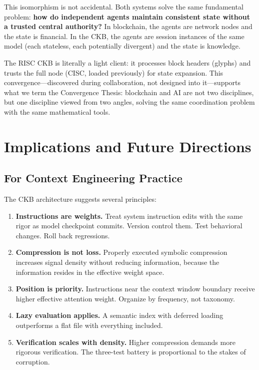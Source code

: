 \documentclass[11pt, a4paper]{article}
\begin{document}
This isomorphism is not accidental. Both systems solve the same fundamental problem: \textbf{how do independent agents maintain consistent state without a trusted central authority?} In blockchain, the agents are network nodes and the state is financial. In the CKB, the agents are session instances of the same model (each stateless, each potentially divergent) and the state is knowledge.

The RISC CKB is literally a light client: it processes block headers (glyphs) and trusts the full node (CISC, loaded previously) for state expansion. This convergence---discovered during collaboration, not designed into it---supports what we term the Convergence Thesis: blockchain and AI are not two disciplines, but one discipline viewed from two angles, solving the same coordination problem with the same mathematical tools.

\section{Implications and Future Directions}
\label{sec:implications}

\subsection{For Context Engineering Practice}

The CKB architecture suggests several principles:

\begin{enumerate}[leftmargin=*]
    \item \textbf{Instructions are weights.} Treat system instruction edits with the same rigor as model checkpoint commits. Version control them. Test behavioral changes. Roll back regressions.
    \item \textbf{Compression is not loss.} Properly executed symbolic compression increases signal density without reducing information, because the information resides in the effective weight space.
    \item \textbf{Position is priority.} Instructions near the context window boundary receive higher effective attention weight. Organize by frequency, not taxonomy.
    \item \textbf{Lazy evaluation applies.} A semantic index with deferred loading outperforms a flat file with everything included.
    \item \textbf{Verification scales with density.} Higher compression demands more rigorous verification. The three-test battery is proportional to the stakes of corruption.
\end{enumerate}
\end{document}
